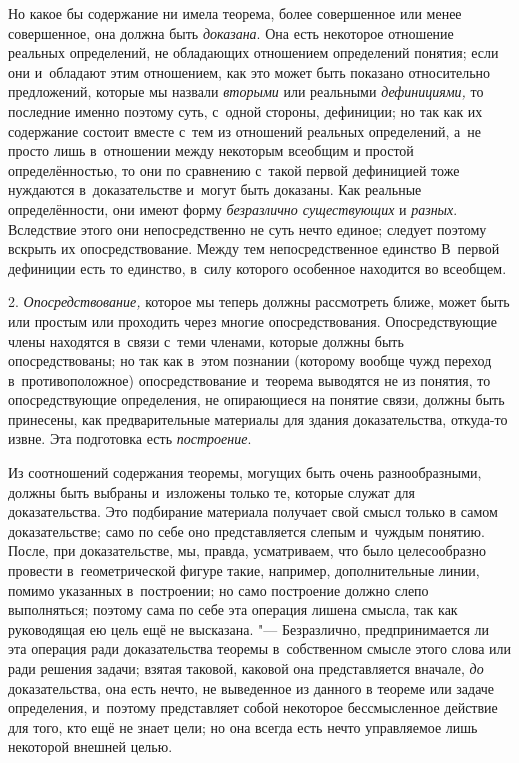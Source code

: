 Но какое бы содержание ни имела теорема, более совершенное или
менее совершенное, она должна быть
{\em доказана}. Она есть
некоторое отношение реальных определений, не обладающих отношением
определений понятия; если они и~обладают этим отношением, как это может
быть показано относительно предложений, которые мы назвали
{\em вторыми} или реальными {\em дефинициями,}
то последние именно поэтому суть, с~одной стороны, дефиниции;
но так как их содержание состоит вместе с~тем из отношений реальных
определений, а~не просто лишь в~отношении между некоторым всеобщим и
простой определённостью, то они по сравнению с~такой первой дефиницией тоже
нуждаются в~доказательстве и~могут быть доказаны. Как реальные
определённости, они имеют форму {\em безразлично существующих} и {\em разных}.
Вследствие этого они непосредственно не суть нечто единое;
следует поэтому вскрыть их опосредствование. Между тем непосредственное
единство В~первой дефиниции есть то единство, в~силу которого особенное
находится во всеобщем.

2. {\em Опосредствование,} которое мы теперь должны рассмотреть ближе, может
быть или простым или проходить через многие опосредствования. Опосредствующие
члены находятся в~связи с~теми членами, которые должны быть опосредствованы;
но так как в~этом познании (которому вообще чужд переход в~противоположное)
опосредствование и~теорема выводятся не из
понятия,
то опосредствующие определения, не опирающиеся на понятие
связи, должны быть принесены, как предварительные материалы для здания
доказательства, откуда-то извне. Эта подготовка есть {\em построение}.

Из соотношений содержания теоремы, могущих быть очень
разнообразными, должны быть выбраны и~изложены только те, которые служат
для доказательства. Это подбирание материала получает свой смысл только в
самом доказательстве; само по себе оно представляется слепым и~чуждым
понятию. После, при доказательстве, мы, правда, усматриваем, что было
целесообразно провести в~геометрической фигуре такие, например, дополнительные
линии, помимо указанных в~построении; но само построение должно слепо
выполняться; поэтому сама по себе эта операция лишена смысла, так как
руководящая ею цель ещё не высказана. "--- Безразлично,
предпринимается ли эта операция ради доказательства теоремы в~собственном
смысле этого слова или ради решения задачи; взятая таковой, каковой она
представляется вначале, {\em до}
доказательства, она есть нечто, не выведенное из данного в
теореме или задаче определения, и~поэтому представляет собой некоторое
бессмысленное действие для того, кто ещё не знает цели; но она всегда есть
нечто управляемое лишь некоторой внешней целью.

